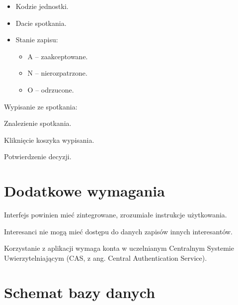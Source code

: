 \documentclass[licencjacka]{pracamgr}
\begin{document}
\begin{step}
\begin{step}
\begin{itemize}
							\item Kodzie jednostki.
							\item Dacie spotkania.
							\item Stanie zapisu:
								\begin{itemize}
									\item A -- zaakceptowane.
									\item N -- nierozpatrzone.
									\item O -- odrzucone.
								\end{itemize}
						\end{itemize}
				\end{step}
			\item Wypisanie ze spotkania:
				\begin{step}
					\item Znalezienie spotkania.
					\item Kliknięcie koszyka wypisania.
					\item Potwierdzenie decyzji.
				\end{step}
	\end{step}
	

\section{Dodatkowe wymagania}
	\begin{step}
		\item Interfejs powinien mieć zintegrowane, zrozumiałe instrukcje użytkowania.
		\item Interesanci nie mogą mieć dostępu do danych zapisów innych interesantów.
		\item Korzystanie z aplikacji wymaga konta w uczelnianym Centralnym Systemie Uwierzytelniającym (CAS, z ang. Central Authentication Service).
	\end{step}
	
\section{Schemat bazy danych}
\end{document}
